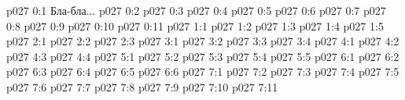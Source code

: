 \author{Совершенствователь Мудрости}
\vs p027 0:1  Бла-бла...
\vs p027 0:2 
\vs p027 0:3 
\vs p027 0:4 
\vs p027 0:5 
\vs p027 0:6 
\vs p027 0:7 
\vs p027 0:8 
\vs p027 0:9 
\vs p027 0:10 
\vs p027 0:11 
\vs p027 1:1 
\vs p027 1:2 \pc 
\vs p027 1:3 
\vs p027 1:4 \pc 
\vs p027 1:5 
\vs p027 2:1 
\vs p027 2:2 
\vs p027 2:3 
\vs p027 3:1 
\vs p027 3:2 
\vs p027 3:3 
\vs p027 3:4 
\vs p027 4:1 
\vs p027 4:2 
\vs p027 4:3 
\vs p027 4:4 
\vs p027 5:1 
\vs p027 5:2 
\vs p027 5:3 
\vs p027 5:4 
\vs p027 5:5 
\vs p027 6:1 
\vs p027 6:2 
\vs p027 6:3 
\vs p027 6:4 
\vs p027 6:5 
\vs p027 6:6 
\vs p027 7:1 
\vs p027 7:2 \pc 
\vs p027 7:3 
\vs p027 7:4 \pc 
\vs p027 7:5 
\vs p027 7:6 
\vs p027 7:7 
\vs p027 7:8 \pc 
\vs p027 7:9 \pc 
\vs p027 7:10 
\vsetoff
\vs p027 7:11 
\quizlink
